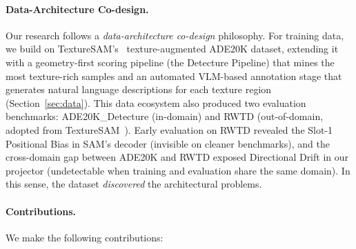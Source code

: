 \documentclass{article}
\begin{document}
\paragraph{Data-Architecture Co-design.}
Our research follows a \emph{data-architecture co-design} philosophy. For training data, we build on TextureSAM's~\cite{texturesam} texture-augmented ADE20K dataset, extending it with a geometry-first scoring pipeline (the Detecture Pipeline) that mines the most texture-rich samples and an automated VLM-based annotation stage that generates natural language descriptions for each texture region (Section~\ref{sec:data}). This data ecosystem also produced two evaluation benchmarks: ADE20K\_Detecture (in-domain) and RWTD (out-of-domain, adopted from TextureSAM~\cite{texturesam}). Early evaluation on RWTD revealed the Slot-1 Positional Bias in SAM's decoder (invisible on cleaner benchmarks), and the cross-domain gap between ADE20K and RWTD exposed Directional Drift in our projector (undetectable when training and evaluation share the same domain). In this sense, the dataset \emph{discovered} the architectural problems.

\paragraph{Contributions.} We make the following contributions:
\end{document}
